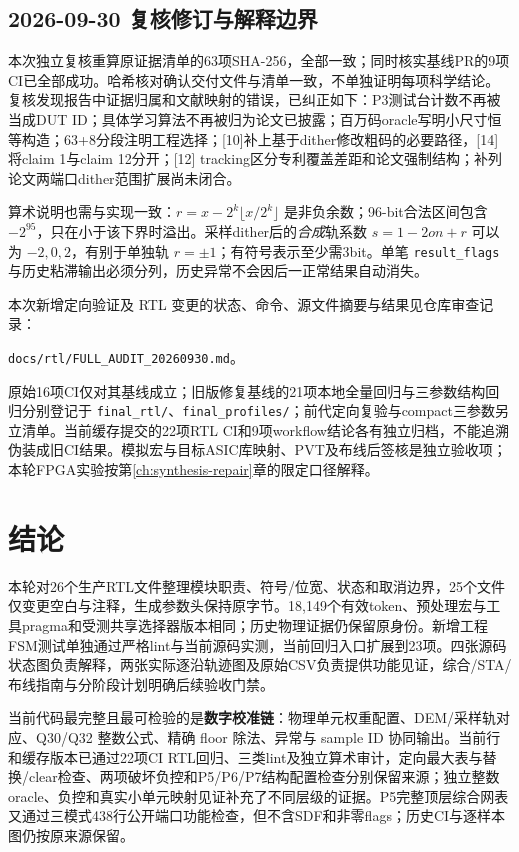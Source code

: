 \documentclass[UTF8,fontset=fandol,11pt,a4paper,openany]{ctexrep}
\newcommand{\code}[1]{\nolinkurl{#1}}
\begin{document}
\section{2026-09-30 复核修订与解释边界}
本次独立复核重算原证据清单的63项SHA-256，全部一致；同时核实基线PR的9项CI已全部成功。哈希核对确认交付文件与清单一致，不单独证明每项科学结论。复核发现报告中证据归属和文献映射的错误，已纠正如下：P3测试台计数不再被当成DUT ID；具体学习算法不再被归为论文已披露；百万码oracle写明小尺寸恒等构造；63+8分段注明工程选择；[10]补上基于dither修改粗码的必要路径，[14]将claim 1与claim 12分开；[12] tracking区分专利覆盖差距和论文强制结构；补列论文两端口dither范围扩展尚未闭合。

算术说明也需与实现一致：\(r=x-2^k\lfloor x/2^k\rfloor\) 是非负余数；96-bit合法区间包含 \(-2^{95}\)，只在小于该下界时溢出。采样dither后的\emph{合成}轨系数 \(s=1-2on+r\) 可以为 \(-2,0,2\)，有别于单独轨 \(r=\pm1\)；有符号表示至少需3bit。单笔 \code{result_flags} 与历史粘滞输出必须分列，历史异常不会因后一正常结果自动消失。

本次新增定向验证及 RTL 变更的状态、命令、源文件摘要与结果见仓库审查记录：\par\noindent\code{docs/rtl/FULL_AUDIT_20260930.md}。\par{}原始16项CI仅对其基线成立；旧版修复基线的21项本地全量回归与三参数结构回归分别登记于 \code{final_rtl/}、\code{final_profiles/}；前代定向复验与compact三参数另立清单。当前缓存提交的22项RTL CI和9项workflow结论各有独立归档，不能追溯伪装成旧CI结果。模拟宏与目标ASIC库映射、PVT及布线后签核是独立验收项；本轮FPGA实验按第\ref{ch:synthesis-repair}章的限定口径解释。









\chapter{结论}
本轮对26个生产RTL文件整理模块职责、符号/位宽、状态和取消边界，25个文件仅变更空白与注释，生成参数头保持原字节。18,149个有效token、预处理宏与工具pragma和受测共享选择器版本相同；历史物理证据仍保留原身份。新增工程FSM测试单独通过严格lint与当前源码实测，当前回归入口扩展到23项。四张源码状态图负责解释，两张实际逐沿轨迹图及原始CSV负责提供功能见证，综合/STA/布线指南与分阶段计划明确后续验收门禁。

当前代码最完整且最可检验的是\textbf{数字校准链}：物理单元权重配置、DEM/采样轨对应、Q30/Q32 整数公式、精确 floor 除法、异常与 sample ID 协同输出。当前行和缓存版本已通过22项CI RTL回归、三类lint及独立算术审计，定向最大表与替换/clear检查、两项破坏负控和P5/P6/P7结构配置检查分别保留来源；独立整数oracle、负控和真实小单元映射见证补充了不同层级的证据。P5完整顶层综合网表又通过三模式438行公开端口功能检查，但不含SDF和非零flags；历史CI与逐样本图仍按原来源保留。
\end{document}

